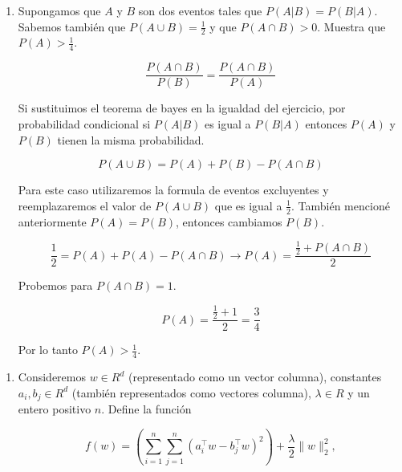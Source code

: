 \documentclass[12pt]{exam}
\begin{document}
\begin{enumerate}
\begin{enumerate}[label=d.]
\end{enumerate}

\begin{enumerate}[label=e.]
\item Supongamos que $A$ y $B$ son dos eventos tales que $P(A|B) = P(B|A)$. Sabemos tambi\'en que $P(A \cup B) = \frac{1}{2}$ y que $P(A \cap B) > 0$. Muestra que $P(A) > \frac{1}{4}$.

\begin{equation}
    \frac{P(A \cap B)}{P(B)} = \frac{P(A \cap B)}{P(A)}
\end{equation}

\justify
Si sustituimos el teorema de bayes en la igualdad del ejercicio, por probabilidad condicional si $P(A|B)$ es igual a $P(B|A)$ entonces $P(A)$ y $P(B)$ tienen la misma probabilidad.

\begin{equation}
    P(A \cup B) = P(A) + P(B) - P(A \cap B)
\end{equation}

\justify
Para este caso utilizaremos la formula de eventos excluyentes y reemplazaremos el valor de $P(A \cup B)$ que es igual a $\frac{1}{2}$. Tambi\'en mencion\'e anteriormente $P(A) = P(B)$, entonces cambiamos $P(B)$.

\begin{equation}
    \frac{1}{2} = P(A) + P(A) - P(A \cap B) \rightarrow P(A) = \frac{\frac{1}{2}+P(A\cap B)}{2}
\end{equation}

\justify
Probemos para $P(A\cap B) = 1$.

\begin{equation}
    P(A) = \frac{\frac{1}{2}+1}{2} = \frac{3}{4}
\end{equation}

\justify
Por lo tanto $P(A) > \frac{1}{4}$.

\end{enumerate}

\begin{enumerate}[label=f.]
\item Consideremos $w\in R^d$ (representado como un vector columna), constantes $a_i, b_j \in R^d$
(tambi\'en representados como vectores columna), $\lambda \in R$ y un entero positivo $n$. Define
la funci\'on

\begin{equation}
    f(w) = (\sum_{i=1}^n\sum_{j=1}^n (a_i^\top w - b_j^\top w)^2) + \frac{\lambda}{2} \|{w}\|_2^2,
\end{equation}


\end{enumerate}
\end{enumerate}
\end{document}
